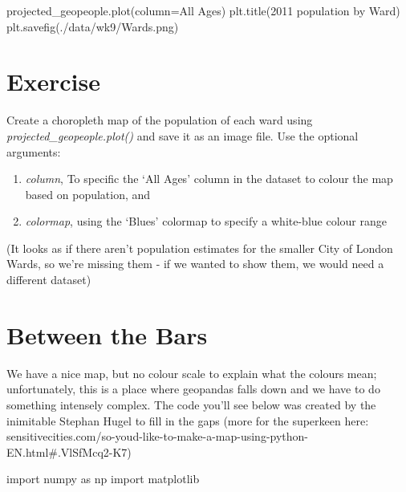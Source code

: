 \documentclass[
  letterpaper,
  DIV=11,
  numbers=noendperiod]{scrreprt}
\newenvironment{Shaded}{\begin{snugshade}}{\end{snugshade}}
\newcommand{\ImportTok}[1]{\textcolor[rgb]{0.00,0.46,0.62}{#1}}
\newcommand{\NormalTok}[1]{\textcolor[rgb]{0.00,0.23,0.31}{#1}}
\newcommand{\OperatorTok}[1]{\textcolor[rgb]{0.37,0.37,0.37}{#1}}
\newcommand{\StringTok}[1]{\textcolor[rgb]{0.13,0.47,0.30}{#1}}
\providecommand{\tightlist}{%
  \setlength{\itemsep}{0pt}\setlength{\parskip}{0pt}}\usepackage{longtable,booktabs,array}
\begin{document}
\begin{Shaded}
\begin{Highlighting}[]
\NormalTok{projected\_geopeople.plot(column}\OperatorTok{=}\StringTok{\textquotesingle{}All Ages\textquotesingle{}}\NormalTok{)}
\NormalTok{plt.title(}\StringTok{\textquotesingle{}2011 population by Ward\textquotesingle{}}\NormalTok{)}
\NormalTok{plt.savefig(}\StringTok{\textquotesingle{}./data/wk9/Wards.png\textquotesingle{}}\NormalTok{)}
\end{Highlighting}
\end{Shaded}

\hypertarget{exercise-23}{%
\section{Exercise}\label{exercise-23}}

Create a choropleth map of the population of each ward using
\emph{projected\_geopeople.plot()} and save it as an image file. Use the
optional arguments:

\begin{enumerate}
\def\labelenumi{\arabic{enumi}.}
\tightlist
\item
  \emph{column}, To specific the `All Ages' column in the dataset to
  colour the map based on population, and
\item
  \emph{colormap}, using the `Blues' colormap to specify a white-blue
  colour range
\end{enumerate}

(It looks as if there aren't population estimates for the smaller City
of London Wards, so we're missing them - if we wanted to show them, we
would need a different dataset)

\hypertarget{between-the-bars}{%
\section{Between the Bars}\label{between-the-bars}}

We have a nice map, but no colour scale to explain what the colours
mean; unfortunately, this is a place where geopandas falls down and we
have to do something intensely complex. The code you'll see below was
created by the inimitable Stephan Hugel to fill in the gaps (more for
the superkeen here:
sensitivecities.com/so-youd-like-to-make-a-map-using-python-EN.html\#.VlSfMcq2-K7)

\begin{Shaded}
\begin{Highlighting}[]
\ImportTok{import}\NormalTok{ numpy }\ImportTok{as}\NormalTok{ np}
\ImportTok{import}\NormalTok{ matplotlib}
\end{Highlighting}
\end{Shaded}
\end{document}
